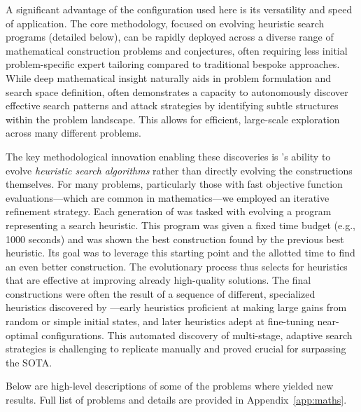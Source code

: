 \newpage %
A significant advantage of the \method configuration used here is its versatility and speed of application. The core methodology, focused on evolving heuristic search programs (detailed below), can be rapidly deployed across a diverse range of mathematical construction problems and conjectures, often requiring less initial problem-specific expert tailoring compared to traditional bespoke approaches. While deep mathematical insight naturally aids in problem formulation and search space definition, \method often demonstrates a capacity to autonomously discover effective search patterns and attack strategies by identifying subtle structures within the problem landscape. This allows for efficient, large-scale exploration across many different problems.

The key methodological innovation enabling these discoveries is \method's ability to evolve \textit{heuristic search algorithms} rather than directly evolving the constructions themselves. For many problems, particularly those with fast objective function evaluations---which are common in mathematics---we employed an iterative refinement strategy. Each generation of \method was tasked with evolving a program representing a search heuristic. This program was given a fixed time budget (e.g., 1000 seconds) and was shown the best construction found by the previous best heuristic. Its goal was to leverage this starting point and the allotted time to find an even better construction. The evolutionary process thus selects for heuristics that are effective at improving already high-quality solutions. The final constructions were often the result of a sequence of different, specialized heuristics discovered by \method---early heuristics proficient at making large gains from random or simple initial states, and later heuristics adept at fine-tuning near-optimal configurations. This automated discovery of multi-stage, adaptive search strategies is challenging to replicate manually and proved crucial for surpassing the SOTA.

Below are high-level descriptions of some of the problems where \method yielded new results. Full list of problems and details are provided in Appendix~\ref{app:maths}.

